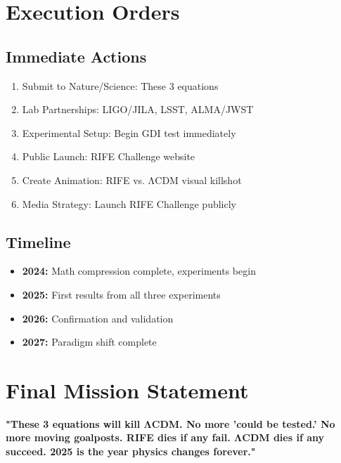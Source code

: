 \documentclass[11pt]{report}
\begin{document}
\section{Execution Orders}

\subsection{Immediate Actions}
\begin{enumerate}
\item Submit to Nature/Science: These 3 equations
\item Lab Partnerships: LIGO/JILA, LSST, ALMA/JWST
\item Experimental Setup: Begin GDI test immediately
\item Public Launch: RIFE Challenge website
\item Create Animation: RIFE vs. ΛCDM visual killshot
\item Media Strategy: Launch RIFE Challenge publicly
\end{enumerate}

\subsection{Timeline}
\begin{itemize}
\item \textbf{2024:} Math compression complete, experiments begin
\item \textbf{2025:} First results from all three experiments
\item \textbf{2026:} Confirmation and validation
\item \textbf{2027:} Paradigm shift complete
\end{itemize}

\section{Final Mission Statement}

\textbf{"These 3 equations will kill ΛCDM. No more 'could be tested.' No more moving goalposts. RIFE dies if any fail. ΛCDM dies if any succeed. 2025 is the year physics changes forever."}
\end{document}
